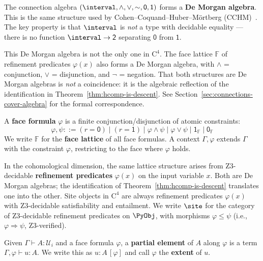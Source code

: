 \begin{remark}
The connection algebra $(\interval, \wedge, \vee, \sim, \mathsf{0},
\mathsf{1})$ forms a \textbf{De Morgan algebra}.  This is the same structure
used by Cohen--Coquand--Huber--M\"ortberg (CCHM)~\cite{cohen2018}.  The key
property is that $\interval$ is \emph{not} a type with decidable equality ---
there is no function $\interval \to \mathsf{2}$ separating $\mathsf{0}$ from
$\mathsf{1}$.

This De Morgan algebra is not the only one in $\mathrm{C}^4$.  The face
lattice $\mathbb{F}$ of refinement predicates $\varphi(x)$ also forms a De
Morgan algebra, with $\wedge$ = conjunction, $\vee$ = disjunction, and
$\neg$ = negation.  That both structures are De Morgan algebras is
\emph{not} a coincidence: it is the algebraic reflection of the
identification in Theorem~\ref{thm:hcomp-is-descent}.  See
Section~\ref{sec:connections-cover-algebra} for the formal correspondence.
\end{remark}

\begin{definition}
\label{def:face-lattice}
A \textbf{face formula} $\varphi$ is a finite conjunction/disjunction of
atomic constraints:
\[
  \varphi, \psi ::= (r = \mathsf{0}) \mid (r = \mathsf{1})
    \mid \varphi \wedge \psi \mid \varphi \vee \psi \mid \mathsf{1}_\mathbb{F}
    \mid \mathsf{0}_\mathbb{F}
\]
We write $\mathbb{F}$ for the \textbf{face lattice} of all face formulas.
A context $\Gamma, \varphi$ extends $\Gamma$ with the constraint $\varphi$,
restricting to the face where $\varphi$ holds.

In the cohomological dimension, the same lattice structure arises
from Z3-decidable \textbf{refinement predicates} $\varphi(x)$ on the
input variable $x$.  Both are De Morgan algebras; the identification
of Theorem~\ref{thm:hcomp-is-descent} translates one into the other.
Site objects in $\mathrm{C}^4$ are always refinement predicates
$\varphi(x)$ with Z3-decidable satisfiability and entailment.  We
write $\site$ for the category of Z3-decidable refinement predicates
on $\PyObj$, with morphisms $\varphi \leq \psi$ (i.e., $\varphi \Rightarrow
\psi$, Z3-verified).
\end{definition}

\begin{definition}
Given $\Gamma \vdash A : \mathcal{U}_i$ and a face formula $\varphi$, a
\textbf{partial element} of $A$ along $\varphi$ is a term
$\Gamma, \varphi \vdash u : A$.  We write this as
$u : A\,[\varphi]$ and call $\varphi$ the \textbf{extent} of $u$.
\end{definition}


